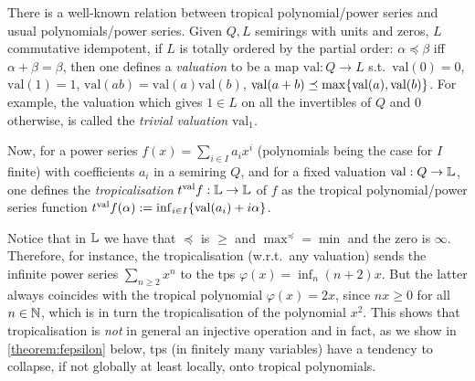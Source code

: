 \begin{remark}\label{rmk:val_trop}
 There is a well-known relation between tropical polynomial/power series and usual polynomials/power series. 
Given $Q,L$ semirings with units and zeros, $L$ commutative idempotent, if $L$ is totally ordered by the partial order: $\alpha \preceq \beta$ iff $\alpha +  \beta = \beta$, then one defines a \emph{valuation} \cite{Izhakian2015} to be a map $\mathrm{val}:Q\to L$ s.t.\ $\mathrm{val}(0)=0$, $\mathrm{val}(1)=1$, $\mathrm{val}(ab)=\mathrm{val}(a)\mathrm{val}(b)$, $\mathrm{val}(a+b)\preceq \max\{\mathrm{val}(a),\mathrm{val}(b)\}$.
For example, the valuation which gives $1\in L$ on all the invertibles of $Q$ and $0$ otherwise, is called the \emph{trivial valuation} $\mathrm{val}_1$.

Now, for a power series $f(x)=\sum_{i\in I} a_i x^i$ (polynomials being the case for $I$ finite) with coefficients $a_i$ in a semiring $Q$, and for a fixed valuation $\mathrm{val}:Q\to \mathbb{L}$, one defines the \emph{tropicalisation} $\trop^{\mathrm{val}}f:\Lawv \to \Lawv$ of $f$ as the tropical polynomial/power series function $\trop^{\mathrm{val}}f(\alpha):=\inf_{i\in I} \set{\mathrm{val}(a_i)+i\alpha}$.
\end{remark}

Notice that in $\mathbb{L}$ we have that $\preceq$ is $\geq$ and $\max^{\preceq}=\min$ and the zero is $\infty$.
Therefore, for instance, the tropicalisation (w.r.t.\ any valuation) sends the infinite power series $\sum_{n\geq 2} x^n$ to the tps $\varphi(x)=\inf_n (n+2)x$.
But the latter always coincides with the tropical polynomial $\varphi(x)=2x$, since $nx\geq 0$ for all $n\in\mathbb{N}$, which is in turn the tropicalisation of the polynomial $x^2$.
This shows that tropicalisation is \emph{not} in general an injective operation and in fact, as we show in \autoref{theorem:fepsilon} below, tps (in finitely many variables) have a tendency to collapse, if not globally at least locally, onto tropical polynomials.


